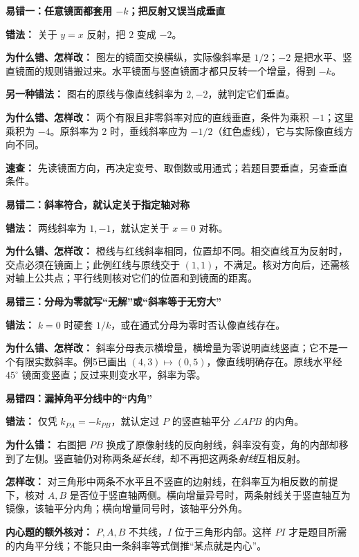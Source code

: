 \clearpage
\begin{trapbox}
\textbf{易错一：任意镜面都套用 $-k$；把反射又误当成垂直}
\begin{center}

\end{center}
\textbf{错法：} 关于 $y=x$ 反射，把 $2$ 变成 $-2$。

\textbf{为什么错、怎样改：} 图左的镜面交换横纵，实际像斜率是 $1/2$；$-2$ 是把水平、竖直镜面的规则错搬过来。水平镜面与竖直镜面才都只反转一个增量，得到 $-k$。

\medskip
\textbf{另一种错法：} 图右的原线与像直线斜率为 $2,-2$，就判定它们垂直。

\textbf{为什么错、怎样改：} 两个有限且非零斜率对应的直线垂直，条件为乘积 $-1$；这里乘积为 $-4$。原斜率为 $2$ 时，垂线斜率应为 $-1/2$（红色虚线），它与实际像直线方向不同。

\medskip
\textbf{速查：} 先读镜面方向，再决定变号、取倒数或用通式；若题目要垂直，另查垂直条件。
\end{trapbox}

\clearpage
\begin{trapbox}
\textbf{易错二：斜率符合，就认定关于指定轴对称}
\begin{center}

\end{center}
\textbf{错法：} 两线斜率为 $1,-1$，就认定关于 $x=0$ 对称。

\textbf{为什么错、怎样改：} 橙线与红线斜率相同，位置却不同。相交直线互为反射时，交点必须在镜面上；此例红线与原线交于 $(1,1)$，不满足。核对方向后，还需核对轴上公共点；平行线则核对它们的位置和到镜面的距离。

\medskip
\textbf{易错三：分母为零就写“无解”或“斜率等于无穷大”}

\textbf{错法：} $k=0$ 时硬套 $1/k$，或在通式分母为零时否认像直线存在。

\textbf{为什么错、怎样改：} 斜率分母表示横增量，横增量为零说明直线竖直；它不是一个有限实数斜率。例5已画出 $(4,3)\mapsto(0,5)$，像直线明确存在。原线水平经 $45^\circ$ 镜面变竖直；反过来则变水平，斜率为零。
\end{trapbox}

\clearpage
\begin{trapbox}
\textbf{易错四：漏掉角平分线中的“内角”}
\begin{center}

\end{center}
\textbf{错法：} 仅凭 $k_{PA}=-k_{PB}$，就认定过 $P$ 的竖直轴平分 $\angle APB$ 的内角。

\textbf{为什么错：} 右图把 $PB$ 换成了原像射线的反向射线，斜率没有变，角的内部却移到了左侧。竖直轴仍对称两条\emph{延长线}，却不再把这两条\emph{射线}互相反射。

\textbf{怎样改：} 对三角形中两条不水平且不竖直的边射线，在斜率互为相反数的前提下，核对 $A,B$ 是否位于竖直轴两侧。横向增量异号时，两条射线关于竖直轴互为镜像，该轴平分内角；横向增量同号时，该轴平分外角。

\medskip
\textbf{内心题的额外核对：} $P,A,B$ 不共线，$I$ 位于三角形内部。这样 $PI$ 才是题目所需的内角平分线；不能只由一条斜率等式倒推“某点就是内心”。
\end{trapbox}
